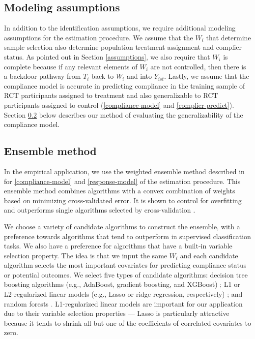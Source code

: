 \documentclass[hidelinks,12pt]{article}
\begin{document}
{{\subsection{Modeling assumptions}  \label{modeling-assumptions}
}
In addition to the identification assumptions, we require additional modeling assumptions for the estimation procedure. We assume that the $W_i$ that determine sample selection also determine population treatment assignment and complier status. As pointed out in Section \ref{assumptions}, we also require that $W_i$ is complete because if any relevant elements of $W_i$ are not controlled, then there is a backdoor pathway from $T_i$ back to $W_i$ and into $Y_{ist}$. Lastly, we assume that the compliance model is accurate in predicting compliance in the training sample of RCT participants assigned to treatment and also generalizable to RCT participants assigned to control (\ref{compliance-model} and \ref{complier-predict}). Section \ref{ensemble} below describes our method of evaluating the generalizability of the compliance model.

{\color{red}
\subsection{Ensemble method}  \label{ensemble}
}

In the empirical application, we use the weighted ensemble method described in \citet{van2007} for \ref{compliance-model} and \ref{response-model} of the estimation procedure. This ensemble method combines algorithms with a convex combination of weights based on minimizing cross-validated error. It is shown to control for overfitting and outperforms single algorithms selected by cross-validation \citep{polley2010super}. 

We choose a variety of candidate algorithms to construct the ensemble, with a preference towards algorithms that tend to outperform in supervised classification tasks. We also have a preference for algorithms that have a built-in variable selection property. The idea is that we input the same $W_i$ and each candidate algorithm selects the most important covariates for predicting compliance status or potential outcomes. We select five types of candidate algorithms: decision tree boosting algorithms (e.g., AdaBoost, gradient boosting, and XGBoost) \citep{freund1996experiments,friedman2000additive,friedman2001greedy}; L1 or L2-regularized linear models (e.g., Lasso or ridge regression, respectively) \citep{tibshirani2012strong}; and random forests \citep{breiman2001}. L1-regularized linear models are important for our application due to their variable selection properties --- Lasso is particularly attractive because it tends to shrink all but one of the coefficients of correlated covariates to zero. 

}
\end{document}
